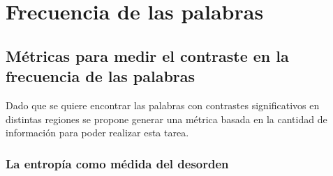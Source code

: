 


\section{Frecuencia de las palabras}


\subsection{Métricas para medir el contraste en la frecuencia de las palabras}
Dado que se quiere encontrar las palabras con contrastes significativos en distintas
regiones se propone generar una métrica basada en la cantidad de información
 para poder realizar esta tarea.
\subsubsection{La entropía como médida del desorden}

